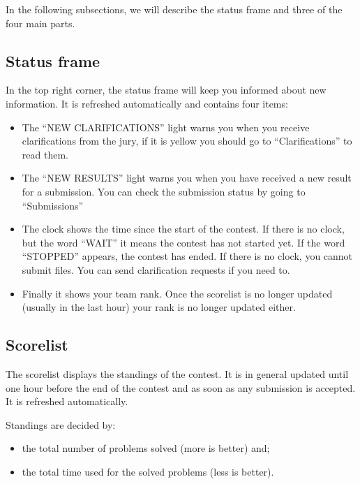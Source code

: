 \documentclass[a4paper]{artikel3}
\begin{document}
In the following subsections, we will describe the status
frame and three of the four main parts.

\subsection{Status frame}

In the top right corner, the status frame will keep you informed about new
information. It is refreshed automatically and contains four items:

\begin{itemize}
\item The ``NEW CLARIFICATIONS'' light warns you when you receive
clarifications from the jury, if it is yellow you should go to
``Clarifications'' to read them.

\item The ``NEW RESULTS'' light warns you when you have received a new result
for a submission. You can check the submission status by going to
``Submissions''

\item The clock shows the time since the start of the contest. If there is
no clock, but the word ``WAIT'' it means the contest has not started yet. If
the word ``STOPPED'' appears, the contest has ended. If there is no clock, you
cannot submit files. You can send clarification requests if you need to.

\item Finally it shows your team rank. Once the scorelist is no longer
updated (usually in the last hour) your rank is no longer updated either.

\end{itemize}

\subsection{Scorelist}

The scorelist displays the standings of the contest. It is in general
updated until one hour before the end of the contest and as soon as any
submission is accepted. It is refreshed automatically.

Standings are decided by:

\begin{itemize}
\item the total number of problems solved (more is better) and;
\item the total time used for the solved problems (less is better).
\end{itemize}
\end{document}
